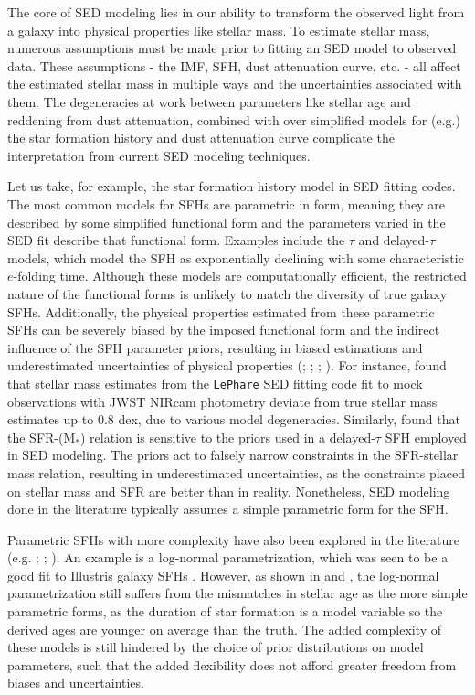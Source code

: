 \documentclass[twocolumn]{aastex62}
\begin{document}
The core of SED modeling lies in our ability to transform the observed light from a galaxy into physical properties like stellar mass. To estimate stellar mass, numerous assumptions must be made prior to fitting an SED model to observed data. These assumptions - the IMF, SFH, dust attenuation curve, etc. - all affect the estimated stellar mass in multiple ways and the uncertainties associated with them. The degeneracies at work between parameters like stellar age and reddening from dust attenuation, combined with over simplified models for (e.g.) the star formation history and dust attenuation curve complicate the interpretation from current SED modeling techniques. 

Let us take, for example, the star formation history model in SED fitting codes. The most common models for SFHs are parametric in form, meaning they are described by some simplified functional form and the parameters varied in the SED fit describe that functional form. Examples include the $\tau$ and delayed-$\tau$ models, which model the SFH as exponentially declining with some characteristic $e$-folding time. Although these models are computationally efficient, the restricted nature of the functional forms is unlikely to match the diversity of true galaxy SFHs. Additionally, the physical properties estimated from these parametric SFHs can be severely biased by the imposed functional form and the indirect influence of the SFH parameter priors, resulting in biased estimations and underestimated uncertainties of physical properties (\cite{simha_parametrising_2014}; \cite{iyer_reconstruction_2017}; \cite{salmon_relation_2015}; \cite{carnall_how_2019}). For instance, \cite{bisigello_statistical_2019} found that stellar mass estimates from the \texttt{LePhare} SED fitting code fit to mock observations with JWST NIRcam photometry deviate from true stellar mass estimates up to 0.8 dex, due to various model degeneracies. Similarly, \cite{curtis-lake_modelling_2020} found that the SFR-(M$_*$) relation is sensitive to the priors used in a delayed-$\tau$ SFH employed in SED modeling. The priors act to falsely narrow constraints in the SFR-stellar mass relation, resulting in underestimated uncertainties, as the constraints placed on stellar mass and SFR are better than in reality. Nonetheless, SED modeling done in the literature typically assumes a simple parametric form for the SFH.  

Parametric SFHs with more complexity have also been explored in the literature (e.g. \cite{pacifici_relative_2012}; \cite{simha_parametrising_2014}; \cite{ciesla_sfr-_2017}). An example is a log-normal parametrization, which was seen to be a good fit to Illustris galaxy SFHs \citep{diemer_log-normal_2017}. However, as shown in \cite{carnall_how_2019} and \cite{leja_how_2019}, the log-normal parametrization still suffers from the mismatches in stellar age as the more simple parametric forms, as the duration of star formation is a model variable so the derived ages are younger on average than the truth. The added complexity of these models is still hindered by the choice of prior distributions on model parameters, such that the added flexibility does not afford greater freedom from biases and uncertainties. 
\end{document}
